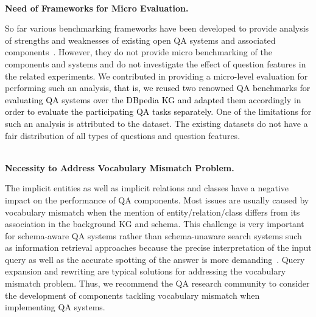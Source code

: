\documentclass[sigconf,edbt]{acmart-edbt2019}
\newcommand{\ks}[1]{\todo[inline, color=yellow]{KS: #1}}
\begin{document}
~\\
{\bf Need of Frameworks for Micro Evaluation.} \begin{inparaenum} 
So far various benchmarking frameworks have been developed to provide analysis of strengths and weaknesses of existing open QA systems and associated components~\cite{GERBILQA,DBLP:conf/www/UsbeckRNBBBCCCE15}. However, they do not provide micro benchmarking of the components and systems and do not investigate the effect of question features in the related experiments. 
We contributed in providing a micro-level evaluation for performing such an analysis\textcolor{black}{, that is, we reused two renowned QA benchmarks for evaluating QA systems over the DBpedia KG and adapted them accordingly in order to evaluate the participating QA tasks separately}.
One of the limitations for such an analysis is attributed to the dataset.
The existing datasets do not have a fair distribution of all types of questions and question features.
\end{inparaenum}
~\\
{\bf Necessity to Address Vocabulary Mismatch Problem.} \begin{inparaenum} 
The implicit entities as well as implicit relations and classes have a negative impact on the performance of QA components.
Most issues are usually caused by vocabulary mismatch when the mention of entity/relation/class differs from its association in the background KG and schema.
This challenge is very important for schema-aware QA systems rather than schema-unaware search systems such as information retrieval approaches because the precise interpretation of the input query as well as the accurate spotting of the answer is more demanding~\cite{DBLP:conf/aaai/ShekarpourMAS17}.
Query expansion and rewriting are typical solutions for addressing the vocabulary mismatch problem. Thus, we recommend the QA research community to consider the development of components tackling vocabulary mismatch when implementing QA systems.
\end{inparaenum}
\end{document}
